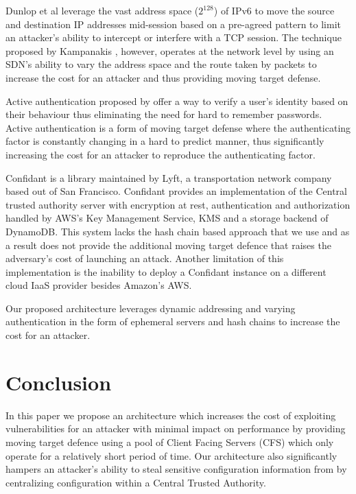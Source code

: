 \documentclass[a4paper,twoside]{article}
\begin{document}
Dunlop et al \cite{dunlop_mt6d:_2011} leverage the vast address space ($2^{128}$) of IPv6 to move the source and destination IP addresses mid-session based on a pre-agreed pattern to limit an attacker's ability to intercept or interfere with a TCP session. The technique proposed by Kampanakis \cite{kampanakis_sdn-based_2014}, however, operates at the network level by using an SDN's ability to vary the address space and the route taken by packets to increase the cost for an attacker and thus providing moving target defense.

Active authentication proposed by \cite{yiu_authentication_2011,aksari_active_2009,li_active_2014} offer a way to verify a user's identity based on their behaviour thus eliminating the need for hard to remember passwords. Active authentication is a form of moving target defense where the authenticating factor is constantly changing in a hard to predict manner, thus significantly increasing the cost for an attacker to reproduce the authenticating factor.

Confidant \cite{lyft_confidant:_2015} is a library maintained by Lyft, a transportation network company based out of San Francisco. Confidant provides an implementation of the Central trusted authority server with encryption at rest, authentication and authorization handled by AWS's Key Management Service, KMS and a storage backend of DynamoDB.  This system lacks the hash chain based approach that we use and as a result does not provide the additional moving target defence that raises the adversary's cost of launching an attack. Another limitation of this implementation is the inability to deploy a Confidant instance on a different cloud IaaS provider besides Amazon's AWS. 

Our proposed architecture leverages dynamic addressing and varying authentication in the form of ephemeral servers and hash chains to increase the cost for an attacker.


\section{Conclusion}

In this paper we propose an architecture which increases the cost of exploiting vulnerabilities  for an attacker with minimal impact on performance by providing moving target defence using a pool of Client Facing Servers (CFS) which only operate for a relatively short period of time. Our architecture also significantly hampers an attacker's ability to steal sensitive configuration information from by centralizing configuration within a Central Trusted Authority.
\end{document}
